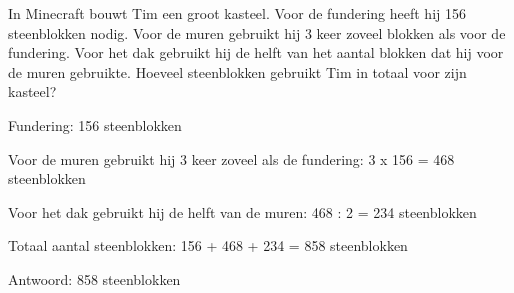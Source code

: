 \begin{opgave}
In Minecraft bouwt Tim een groot kasteel. Voor de fundering heeft hij 156 
steenblokken nodig. Voor de muren gebruikt hij 3 keer zoveel blokken als voor 
de fundering. Voor het dak gebruikt hij de helft van het aantal blokken dat 
hij voor de muren gebruikte. Hoeveel steenblokken gebruikt Tim in totaal voor 
zijn kasteel?
\end{opgave}

\begin{oplossing}
Fundering: 156 steenblokken

Voor de muren gebruikt hij 3 keer zoveel als de fundering:
3 x 156 = 468 steenblokken

Voor het dak gebruikt hij de helft van de muren:
468 : 2 = 234 steenblokken

Totaal aantal steenblokken:
156 + 468 + 234 = 858 steenblokken

Antwoord: 858 steenblokken
\end{oplossing}